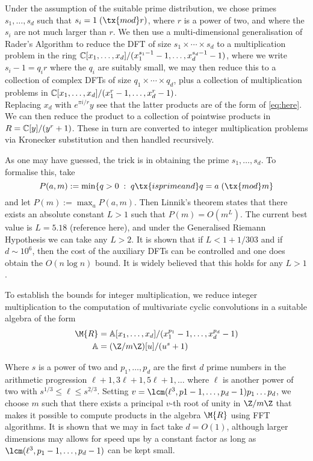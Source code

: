 Under the assumption of the suitable prime distribution, we chose primes $s_1, \ldots, s_d$ such that $s_i = 1 \;(\tx{mod } r)$, where $r$ is a power of two, and where the $s_i$ are not much larger than $r$. We then use a multi-dimensional generalisation of Rader's Algorithm to reduce the DFT of size $s_1 \times \cdots \times s_d$ to a multiplication problem in the ring $\mathbb{C}[x_1, \ldots, x_d] / (x_1^{s_1 - 1} - 1, \ldots, x_d^{s_d - 1} - 1)$, where we write $s_i - 1 = q_i r$ where the $q_i$ are suitably small, we may then reduce this to a collection of complex DFTs of size $q_1 \times \cdots \times q_d$, plus a collection of multiplication problems in $\mathbb{C}[x_1, \ldots, x_d] / (x_1^r - 1, \ldots, x_d^r - 1)$. \\
Replacing $x_d$ with $e^{\pi i / r}y$ see that the latter products are of the form of \ref{eq:here}.  We can then reduce the product to a collection of pointwise products in $R = \mathbb{C}[y] / (y^r + 1)$. These in turn are converted to integer multiplication problems via Kronecker substitution and then handled recursively.

As one may have guessed, the trick is in obtaining the prime $s_1, \ldots, s_d$. To formalise this, take 
\[
    P(a, m) := \min\{q > 0\;:\; q \tx{ is prime and } q = a \;(\tx{mod } m\}
\]
and let $P(m) := \max_a P(a, m)$. Then Linnik's theorem states that there exists an absolute constant $L > 1$ such that $P(m) = O(m^L)$. The current best value is $L = 5.18$ (reference here), and under the Generalised Riemann Hypothesis we can take any $L > 2$. It is shown \cite{ffnlogn} that if $L < 1 + 1/303$ and if $d \sim 10^6$, then the cost of the auxiliary DFTs can be controlled and one does obtain the $O(n \log n)$ bound. It is widely believed that this holds for any $L > 1$.

To establish the bounds for integer multiplication, we reduce integer multiplication to the computation of multivariate cyclic convolutions in a suitable algebra of the form
\begin{align*}
    \M{R} &= \mathbb{A}[x_1, \ldots, x_d] / (x_1^{p_1} - 1, \ldots, x_d^{p_d} - 1)\\
    \mathbb{A} &= (\Z / m\Z)[u] / (u^s + 1)
\end{align*}

Where $s$ is a power of two and $p_1, \ldots, p_d$ are the first $d$ prime numbers in the arithmetic progression $\ell + 1, 3\ell + 1, 5\ell + 1, \ldots$ where $\ell$ is another power of two with $s^{1/3} \leq \ell \leq s^{2/3}$.  Setting $v = \lcm(\ell^3, p1 - 1, \ldots, p_d - 1)p_1\dots p_d$, we choose $m$ such that there exists a principal $v$-th root of unity in $\Z/m\Z$ that makes it possible to compute products in the algebra $\M{R}$ using FFT algorithms. It is shown that we may in fact take $d = O(1)$, although larger dimensions may allows for speed ups by a constant factor as long as $\lcm(\ell^3, p_1 - 1, \ldots, p_d - 1)$ can be kept small.

